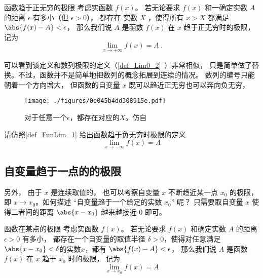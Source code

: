 \begin{definition}{函数趋于正无穷的极限}\label{def_FunLim_1}
考虑实函数 $f(x)$。 若无论要求 $f(x)$ 和一确定实数 $A$ 的距离 $\epsilon$ 有多小（但 $\epsilon>0$）， 都存在 实数 $X$ ，使得所有 $x>X$ 都满足 $\abs{f(x)-A}<\epsilon$， 那么我们说 $A$ 是函数 $f(x)$ 在 $x$ 趋于正无穷时的极限， 记为
\begin{equation}
\lim\limits_{x\to +\infty} f(x) = A~.
\end{equation}
\end{definition}

可以看到该定义和数列极限的定义（\autoref{def_Lim0_2}~）非常相似， 只是简单做了替换。不过，函数并不是简单地把数列的概念拓展到连续的情况。 数列的编号只能朝着一个方向增大， 但函数的自变量 $x$ 既可以趋近正无穷也可以奔向负无穷， 

\begin{figure}[ht]
\centering
\texttt{[image: ./figures/0e045b4dd308915e.pdf]}
\caption{对于任意一个$\epsilon$，都存在对应的$X$。仿自\cite{Thomas}} \label{fig_FunLim_5}
\end{figure}

\begin{exercise}{}
请仿照\autoref{def_FunLim_1} 给出函数趋于负无穷时极限的定义
\begin{equation}
\lim\limits_{x\to -\infty} f(x) = A
\end{equation}
\end{exercise}

\subsection{自变量趋于一点的的极限}
另外， 由于 $x$ 是连续取值的， 也可以考察自变量 $x$ 不断趋近某一点 $x_0$ 的极限， 即 $x\to x_0$。如何描述 “自变量趋于一个给定的实数 $x_0$” 呢？ 只需要取自变量 $x$ 使得二者间的距离 $\abs{x-x_0}$ 越来越接近 $0$ 即可。

\begin{definition}{函数在某点的极限}\label{def_FunLim_3}
考虑实函数 $f(x)$。 若无论要求 $f(x)$ 和确定实数 $A$ 的距离 $\epsilon>0$ 有多小， 都存在一个自变量的取值半径 $\delta>0$，使得对任意满足 $\abs{x-x_0} < \delta$的实数$x$，都有 $\abs{f(x)-A}<\epsilon$，
那么我们说 $A$ 是函数 $f(x)$ 在 $x$ 趋于 $x_0$ 时的极限， 记为
\begin{equation}
\lim\limits_{x\to x_0}f(x)=A
\end{equation}
\end{definition}

